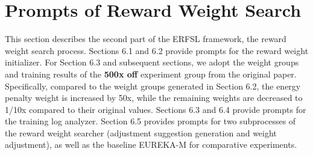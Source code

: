 \documentclass{article}
\begin{document}
\section{Prompts of Reward Weight Search} 
This section describes the second part of the ERFSL framework, the reward weight search process. Sections 6.1 and 6.2 provide prompts for the reward weight initializer. For Section 6.3 and subsequent sections, we adopt the weight groups and training results of the \textbf{500x off} experiment group from the original paper. Specifically, compared to the weight groups generated in Section 6.2, the energy penalty weight is increased by 50x, while the remaining weights are decreased to 1/10x compared to their original values. Sections 6.3 and 6.4 provide prompts for the training log analyzer. Section 6.5 provides prompts for two subprocesses of the reward weight searcher (adjustment suggestion generation and weight adjustment), as well as the baseline EUREKA-M for comparative experiments.
\end{document}
